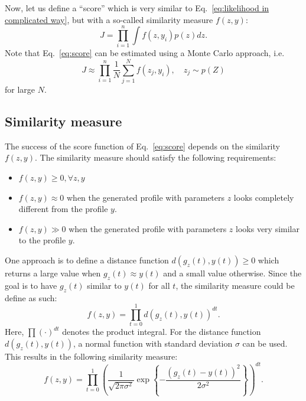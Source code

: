 \documentclass[10pt,final,a4paper,oneside,onecolumn]{article}
\theoremstyle{plain}\newtheorem{definition}{Definition}[section]    %
\theoremstyle{definition}\newtheorem{example}{Example}[section]     %
\theoremstyle{remark}\newtheorem{remarkenv}{Remark}[section]        %
\begin{document}
Now, let us define a ``score'' which is very similar to Eq.~\eqref{eq:likelihood in complicated way}, but with a so-called similarity measure $f(z,y)$:
\begin{equation} \label{eq:score}
	J = \prod_{i=1}^n \int f(z,y_i)p(z)dz.
\end{equation}
Note that Eq.~\eqref{eq:score} can be estimated using a Monte Carlo approach, i.e.
\begin{equation} \label{eq:score monte carlo}
	J \approx \prod_{i=1}^n \frac{1}{N} \sum_{j=1}^N f(z_j, y_i), \quad z_j \sim p(Z)
\end{equation}
for large $N$.

\subsection{Similarity measure}
\label{sec:method similarity function}

The success of the score function of Eq.~\eqref{eq:score} depends on the similarity $f(z,y)$. The similarity measure should satisfy the following requirements:
\begin{itemize}
	\item $f(z,y) \geq 0, \forall z, y$
	\item $f(z,y) \approx 0$ when the generated profile with parameters $z$ looks completely different from the profile $y$.
	\item $f(z,y) \gg 0$ when the generated profile with parameters $z$ looks very similar to the profile $y$.
\end{itemize}

One approach is to define a distance function $d(g_z(t), y(t)) \geq 0$ which returns a large value when $g_z(t) \approx y(t)$ and a small value otherwise. Since the goal is to have $g_z(t)$ similar to $y(t)$ for all $t$, the similarity measure could be define as such:
\begin{equation}
	f(z,y) = \prod_{t=0}^{1} d(g_z(t), y(t))^{dt}.
\end{equation}
Here, $\prod (\cdot)^{dt}$ denotes the product integral. For the distance function $d(g_z(t), y(t))$, a normal function with standard deviation $\sigma$ can be used. This results in the following similarity measure:
\begin{equation} \label{eq:similarity measure normal function}
	f(z,y) = \prod_{t=0}^{1} \left( \frac{1}{\sqrt{2\pi\sigma^2}} \exp \left\{ -\frac{(g_z(t)-y(t))^2}{2\sigma^2} \right\} \right)^{dt}.
\end{equation}
\end{document}
